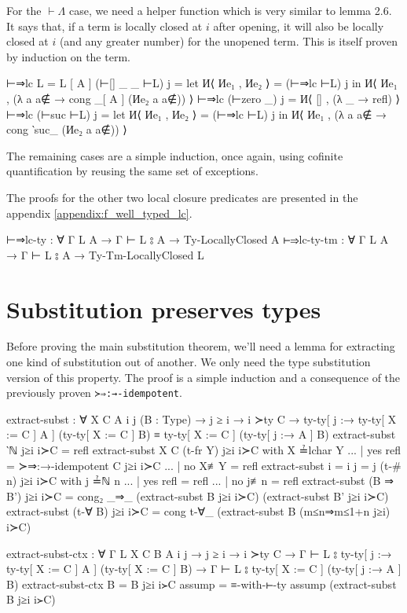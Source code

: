 \documentclass[logo,bsc,singlespacing,parskip,online]{infthesis}
\begin{document}
For the $\vdash\Lambda$ case, we need a helper function which is very similar to lemma 2.6. It says
that, if a term is locally closed at $i$ after opening, it will also be locally closed at $i$ (and
any greater number) for the unopened term. This is itself proven by induction on the term.
\begin{code}
  ⊢⇒lc {L = L [ A ]} (⊢[] _ _ ⊢L) j =
    let И⟨ Иe₁ , Иe₂ ⟩ = (⊢⇒lc ⊢L) j
    in И⟨ Иe₁ , (λ a {a∉} → cong _[ A ]  (Иe₂ a {a∉})) ⟩
  ⊢⇒lc (⊢zero _) j = И⟨ [] , (λ _ → refl) ⟩
  ⊢⇒lc (⊢suc ⊢L) j = let И⟨ Иe₁ , Иe₂ ⟩ = (⊢⇒lc ⊢L) j
    in И⟨ Иe₁ , (λ a {a∉} → cong ‵suc_ (Иe₂ a {a∉})) ⟩
\end{code}
The remaining cases are a simple induction, once again, using cofinite quantification by reusing the
same set of exceptions.

The proofs for the other two local closure predicates are presented in the appendix \ref{appendix:f_well_typed_lc}.
\begin{code}
  ⊢⇒lc-ty : ∀ {Γ L A} → Γ ⊢ L ⦂ A → Ty-LocallyClosed A
  ⊢⇒lc-ty-tm : ∀ {Γ L A} → Γ ⊢ L ⦂ A → Ty-Tm-LocallyClosed L
\end{code}

\section{Substitution preserves types}
Before proving the main substitution theorem, we'll need a lemma for extracting one kind of
substitution out of another. We only need the type substitution version of this property. The proof
is a simple induction and a consequence of the previously proven \texttt{≻⇒:→-idempotent}.
\begin{code}
  extract-subst : ∀ {X C A i j}
    (B : Type)
    → j ≥ i
    → i ≻ty C
    → ty-ty[ j :→ ty-ty[ X := C ] A ] (ty-ty[ X := C ] B)
        ≡ ty-ty[ X := C ] (ty-ty[ j :→ A ] B)
  extract-subst ‵ℕ j≥i i≻C = refl
  extract-subst {X} {C} (t-fr Y) j≥i i≻C with X ≟lchar Y
  ... | yes refl = ≻⇒:→-idempotent C j≥i i≻C
  ... | no  X≢Y  = refl
  extract-subst {i = i} {j = j} (t-# n) j≥i i≻C with j ≟ℕ n
  ... | yes refl = refl
  ... | no  j≢n  = refl
  extract-subst (B ⇒ B') j≥i i≻C = cong₂ _⇒_
    (extract-subst B j≥i i≻C) (extract-subst B' j≥i i≻C)
  extract-subst (t-∀ B) j≥i i≻C =
    cong t-∀_ (extract-subst B (m≤n⇒m≤1+n j≥i) i≻C)

  extract-subst-ctx : ∀ {Γ L X C B A i j}
    → j ≥ i
    → i ≻ty C
    → Γ ⊢ L ⦂ ty-ty[ j :→ ty-ty[ X := C ] A ] (ty-ty[ X := C ] B)
    → Γ ⊢ L ⦂ ty-ty[ X := C ] (ty-ty[ j :→ A ] B)
  extract-subst-ctx {B = B} j≥i i≻C assump =
    ≡-with-⊢-ty assump (extract-subst B j≥i i≻C)
\end{code}
\end{document}
